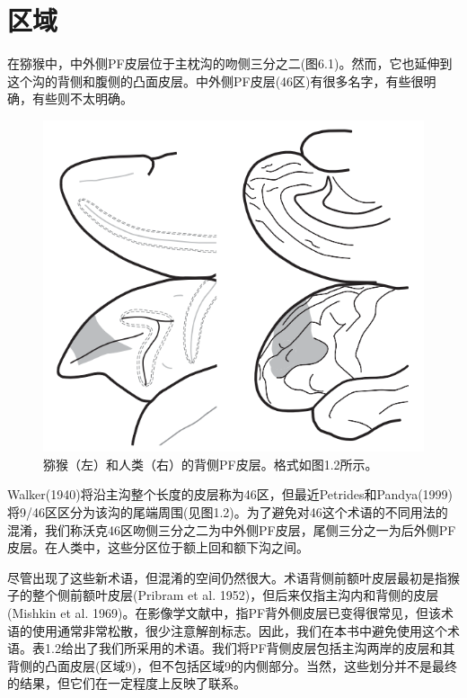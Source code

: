 \section{区域}
在猕猴中，中外侧PF皮层位于主枕沟的吻侧三分之二(图6.1)。然而，它也延伸到这个沟的背侧和腹侧的凸面皮层。中外侧PF皮层(46区)有很多名字，有些很明确，有些则不太明确。
\begin{figure}
	\centering
	\includegraphics[width=0.7\linewidth]{image_pfc/Fig_6_1}
	\caption{猕猴（左）和人类（右）的背侧PF皮层。格式如图1.2所示。}
	\label{fig:fig}
\end{figure}

Walker(1940)将沿主沟整个长度的皮层称为46区，但最近Petrides和Pandya(1999)将9/46区区分为该沟的尾端周围(见图1.2)。为了避免对46这个术语的不同用法的混淆，我们称沃克46区吻侧三分之二为中外侧PF皮层，尾侧三分之一为后外侧PF皮层。在人类中，这些分区位于额上回和额下沟之间。

尽管出现了这些新术语，但混淆的空间仍然很大。术语背侧前额叶皮层最初是指猴子的整个侧前额叶皮层(Pribram et al. 1952)，但后来仅指主沟内和背侧的皮层(Mishkin et al. 1969)。在影像学文献中，指PF背外侧皮层已变得很常见，但该术语的使用通常非常松散，很少注意解剖标志。因此，我们在本书中避免使用这个术语。表1.2给出了我们所采用的术语。我们将PF背侧皮层包括主沟两岸的皮层和其背侧的凸面皮层(区域9)，但不包括区域9的内侧部分。当然，这些划分并不是最终的结果，但它们在一定程度上反映了联系。
